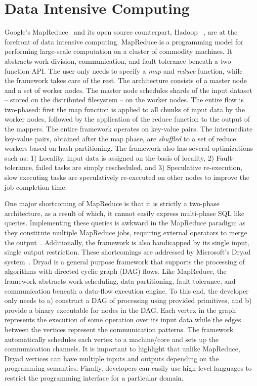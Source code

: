 \documentclass[a4paper,12pt,twoside,openright]{report}
\begin{document}
\section{Data Intensive
Computing}\label{chapter:background:section:dataIntensive}
Google's MapReduce~\cite{Dean:2004:MSD} and its open source counterpart, Hadoop
~\cite{hadoop}, are at the forefront of data intensive computing. MapReduce is a
programming model for performing large-scale computation on a cluster of
commodity machines. It abstracts work division, communication, and fault
tolerance beneath a two function API. The user only needs to specify a
\emph{map} and \emph{reduce} function, while the framework takes care of the
rest. The architecture consists of a master node and a set of worker nodes.
The master node schedules shards of the input dataset -- stored on the
distributed filesystem -- on the worker nodes. The entire flow is two-phased:
first the map function is applied to all chunks of input data by the worker
nodes, followed by the application of the reduce function to the output of the
mappers. The entire framework operates on key-value pairs. The intermediate
key-value pairs, obtained after the map phase, are \emph{shuffled} to a set of
reduce workers based on hash partitioning. The framework also has several
optimizations such as: 1) Locality, input data is assigned on the basis of
locality, 2) Fault-tolerance, failed tasks are simply rescheduled, and 3)
Speculative re-execution, slow executing tasks are speculatively re-executed on
other nodes to improve the job completion time.

One major shortcoming of MapReduce is that it is strictly a two-phase
architecture, as a result of which, it cannot easily express multi-phase SQL
like queries. Implementing these queries is awkward in the MapReduce paradigm as
they constitute multiple MapReduce jobs, requiring external operators to merge
the output~\cite{Yang:2007:MSR}. Additionally, the framework is also handicapped
by its single input, single output restriction. These shortcomings are addressed
by Microsoft's Dryad system~\cite{Isard:2007:DDD}. Dryad is a general purpose
framework that supports the processing of algorithms with directed cyclic graph
(DAG) flows. Like MapReduce, the framework abstracts work scheduling, data
partitioning, fault tolerance, and communication beneath a data-flow execution
engine. To this end, the developer only needs to a) construct a DAG of
processing using provided primitives, and b) provide a binary executable for
nodes in the DAG. Each vertex in the graph represents the execution of some
operation over its input data while the edges between the vertices represent the
communication patterns. The framework automatically schedules each vertex to a
machine/core and sets up the communication channels.
It is important to highlight that unlike MapReduce, Dryad vertices can have
multiple inputs and outputs depending on the programming semantics. Finally,
developers can easily use high-level languages to restrict the programming
interface for a particular domain.
\end{document}
